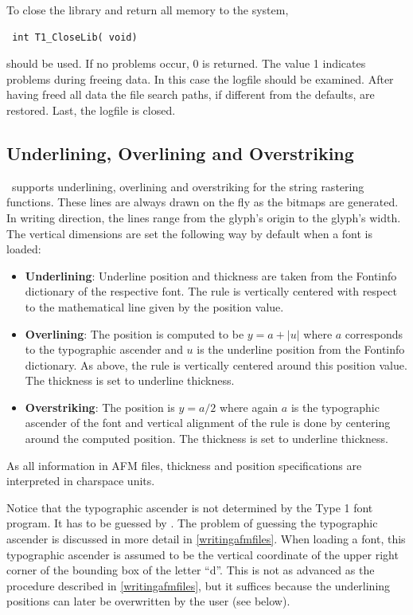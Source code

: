 To close the library and return all memory to the system, 
\precorr
\begin{verbatim}
 int T1_CloseLib( void)
\end{verbatim}\postcorr
should be used. If no problems occur, 0 is returned. The value 1 indicates
problems during freeing data. In this case the logfile should be examined. 
After having freed all data the file search paths, if different from the
defaults, are restored. Last, the logfile  is closed.


\subsection{Underlining, Overlining and Overstriking}
\label{underlining}%
\tonelib\ supports underlining, overlining and overstriking for the string
rastering functions. These lines are always drawn on the fly as the bitmaps
are generated. In writing direction, the lines range from the glyph's origin
to the glyph's width. The vertical dimensions are set the following way by
default when a font is loaded:
\begin{itemize}
\item {\bf Underlining}: Underline position and thickness are taken from the
  Fontinfo dictionary of the respective font. The rule is vertically centered
  with respect to the mathematical line given by the position value.
\item {\bf Overlining}: The position is computed to be $y=a+|u|$ where $a$
  corresponds to the typographic ascender and $u$ is the underline position
  from the Fontinfo dictionary. As above, the rule is vertically centered
  around this position value. The thickness is set to underline thickness.
\item {\bf Overstriking}: The position is $y=a/2$ where again $a$ is the
  typographic ascender of the font and vertical alignment of the rule is done
  by centering around the computed position. The thickness is set to underline
  thickness. 
\end{itemize}
As all information in AFM files, thickness and position specifications are
interpreted in charspace units.

Notice that the typographic ascender is not determined by the Type 1 font
program. It has to be guessed by \tonelib. The problem of guessing the
typographic ascender is discussed in more detail in \ref{writingafmfiles}.
When loading a font, this typographic ascender is assumed to be the vertical
coordinate of the upper right corner of the bounding box of the letter ``d''.
This is not as advanced as the procedure described in \ref{writingafmfiles},
but it suffices because the underlining positions can later be overwritten by
the user (see below).

